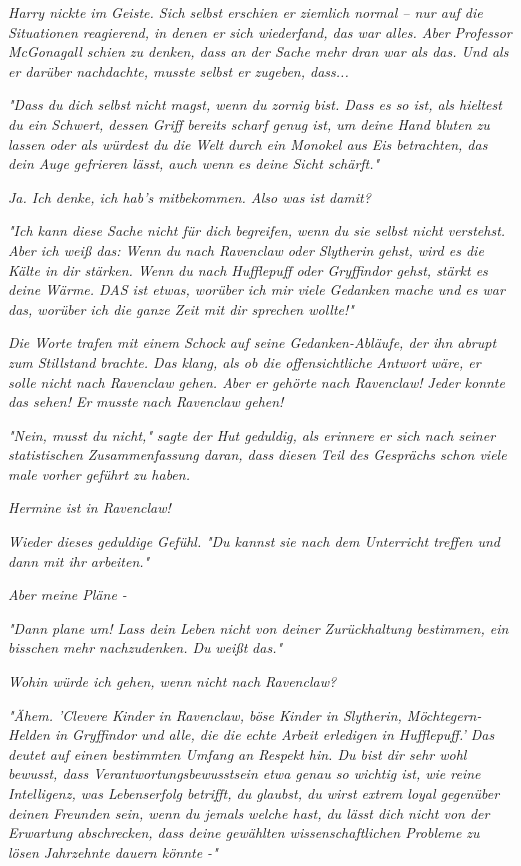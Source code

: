{\emph{Harry nickte im Geiste. Sich selbst erschien er ziemlich normal -- nur auf die Situationen reagierend, in denen er sich wiederfand, das war alles. Aber Professor McGonagall schien zu denken, dass an der Sache mehr dran war als das. Und als er darüber nachdachte, musste selbst er zugeben, dass...}

\emph{\emph{"Dass du dich selbst nicht magst, wenn du zornig bist. Dass es so ist, als hieltest du ein Schwert, dessen Griff bereits scharf genug ist, um deine Hand bluten zu lassen oder als würdest du die Welt durch ein Monokel aus Eis betrachten, das dein Auge gefrieren lässt, auch wenn es deine Sicht schärft."}}

\emph{Ja. Ich denke, ich hab's mitbekommen. Also was ist damit?}

\emph{"Ich kann diese Sache nicht für dich begreifen, wenn du sie selbst nicht verstehst. Aber ich weiß das: Wenn du nach Ravenclaw oder Slytherin} \emph{gehst, wird es die Kälte in dir stärken. Wenn du nach Hufflepuff oder Gryffindor gehst, stärkt es deine Wärme. DAS ist etwas, worüber ich mir viele Gedanken mache und es war das, worüber ich die ganze Zeit mit dir sprechen wollte!"}

\emph{Die Worte trafen mit einem Schock auf seine Gedanken-Abläufe, der ihn abrupt zum Stillstand brachte. Das klang, als ob die offensichtliche Antwort wäre, er solle nicht nach Ravenclaw gehen. Aber er} \emph{\emph{gehörte}} \emph{nach Ravenclaw!} \emph{\emph{Jeder}} \emph{konnte das sehen! Er} \emph{\emph{musste}} \emph{nach Ravenclaw gehen!}

\emph{\emph{"Nein, musst du nicht,"}} \emph{sagte der Hut geduldig, als erinnere er sich nach seiner statistischen Zusammenfassung daran, dass} \emph{\emph{diesen}} \emph{Teil des Gesprächs schon viele male vorher geführt zu haben.}

\emph{\emph{Hermine ist in Ravenclaw!}}

\emph{Wieder dieses geduldige Gefühl.} \emph{\emph{"Du kannst sie nach dem Unterricht treffen und dann mit ihr arbeiten."}}

\emph{Aber meine Pläne -}

\emph{"Dann plane um! Lass dein Leben nicht von deiner Zurückhaltung bestimmen, ein bisschen mehr nachzudenken. Du} \emph{weißt} \emph{\emph{das."}}

\emph{Wohin würde ich gehen, wenn nicht nach Ravenclaw?}

\emph{"Ähem. '\emph{Clevere Kinder in Ravenclaw, böse Kinder in Slytherin, Möchtegern-Helden in Gryffindor und alle, die die echte Arbeit erledigen in Hufflepuff.' Das deutet auf einen bestimmten Umfang an Respekt hin. Du bist dir sehr wohl bewusst, dass Verantwortungsbewusstsein etwa genau so wichtig ist, wie reine Intelligenz, was Lebenserfolg betrifft, du glaubst, du wirst extrem loyal gegenüber deinen Freunden sein, wenn du jemals welche hast, du lässt dich nicht von der Erwartung abschrecken, dass deine gewählten wissenschaftlichen Probleme zu lösen Jahrzehnte dauern könnte -"}}

}
